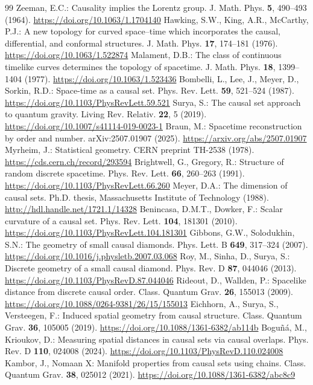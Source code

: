 \documentclass[11pt,a4paper]{article}
\newcommand{\doi}[1]{\url{https://doi.org/#1}}
\begin{document}
\begin{thebibliography}{99}\small
{} Zeeman, E.C.: Causality implies the Lorentz group. J. Math. Phys. \textbf{5}, 490--493 (1964). \doi{10.1063/1.1704140}
 Hawking, S.W., King, A.R., McCarthy, P.J.: A new topology for curved space--time which incorporates the causal, differential, and conformal structures. J. Math. Phys. \textbf{17}, 174--181 (1976). \doi{10.1063/1.522874}
 Malament, D.B.: The class of continuous timelike curves determines the topology of spacetime. J. Math. Phys. \textbf{18}, 1399--1404 (1977). \doi{10.1063/1.523436}
 Bombelli, L., Lee, J., Meyer, D., Sorkin, R.D.: Space-time as a causal set. Phys. Rev. Lett. \textbf{59}, 521--524 (1987). \doi{10.1103/PhysRevLett.59.521}
 Surya, S.: The causal set approach to quantum gravity. Living Rev. Relativ. \textbf{22}, 5 (2019). \doi{10.1007/s41114-019-0023-1}
 Braun, M.: Spacetime reconstruction by order and number. arXiv:2507.01907 (2025). \url{https://arxiv.org/abs/2507.01907}
 Myrheim, J.: Statistical geometry. CERN preprint TH-2538 (1978). \url{https://cds.cern.ch/record/293594}
 Brightwell, G., Gregory, R.: Structure of random discrete spacetime. Phys. Rev. Lett. \textbf{66}, 260--263 (1991). \doi{10.1103/PhysRevLett.66.260}
 Meyer, D.A.: The dimension of causal sets. Ph.D. thesis, Massachusetts Institute of Technology (1988). \url{http://hdl.handle.net/1721.1/14328}
 Benincasa, D.M.T., Dowker, F.: Scalar curvature of a causal set. Phys. Rev. Lett. \textbf{104}, 181301 (2010). \doi{10.1103/PhysRevLett.104.181301}
 Gibbons, G.W., Solodukhin, S.N.: The geometry of small causal diamonds. Phys. Lett. B \textbf{649}, 317--324 (2007). \doi{10.1016/j.physletb.2007.03.068}
 Roy, M., Sinha, D., Surya, S.: Discrete geometry of a small causal diamond. Phys. Rev. D \textbf{87}, 044046 (2013). \doi{10.1103/PhysRevD.87.044046}
 Rideout, D., Wallden, P.: Spacelike distance from discrete causal order. Class. Quantum Grav. \textbf{26}, 155013 (2009). \doi{10.1088/0264-9381/26/15/155013}
 Eichhorn, A., Surya, S., Versteegen, F.: Induced spatial geometry from causal structure. Class. Quantum Grav. \textbf{36}, 105005 (2019). \doi{10.1088/1361-6382/ab114b}
 Bogu\~n\'a, M., Krioukov, D.: Measuring spatial distances in causal sets via causal overlaps. Phys. Rev. D \textbf{110}, 024008 (2024). \doi{10.1103/PhysRevD.110.024008}
 Kambor, J., Nomaan X: Manifold properties from causal sets using chains. Class. Quantum Grav. \textbf{38}, 025012 (2021). \doi{10.1088/1361-6382/abc8c9}

\end{thebibliography}
\end{document}
